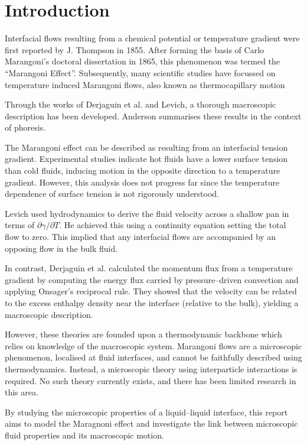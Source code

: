 \section{Introduction}
Interfacial flows resulting from a chemical potential or temperature gradient were first reported by J. Thompson in 1855.\cite{JThompson}
After forming the basis of Carlo Marangoni's doctoral dissertation in 1865, this phenomenon was termed the ``Marangoni Effect''.\cite{Marangoni}
Subsequently, many scientific studies have focussed on temperature induced Marangoni flows, also known as thermocapillary motion

Through the works of Derjaguin et al.\cite{SurfaceForces} and Levich\cite{Levich}, a thorough macroscopic description has been developed.
Anderson summarises these results in the context of phoresis.\cite{Anderson}

The Marangoni effect can be described as resulting from an interfacial tension gradient.
Experimental studies indicate hot fluids have a lower surface tension than cold fluids,\cite{Ficalbi1972,Kayser1975} inducing motion in the opposite direction to a temperature gradient.
However, this analysis does not progress far since the temperature dependence of surface tension is not rigorously understood.

Levich used hydrodynamics to derive the fluid velocity across a shallow pan in terms of $\partial \gamma / \partial T$.\cite{Levich}
He achieved this using a continuity equation setting the total flow to zero.
This implied that any interfacial flows are accompanied by an opposing flow in the bulk fluid.

In contrast, Derjaguin et al. calculated the momentum flux from a temperature gradient by computing the energy flux carried by pressure--driven convection and applying Onsager's reciprocal rule.\cite{SurfaceForces}
They showed that the velocity can be related to the excess enthalpy density near the interface (relative to the bulk), yielding a macroscopic description.

However, these theories are founded upon a thermodynamic backbone which relies on knowledge of the macroscopic system.
Marangoni flows are a microscopic phenomenon, localised at fluid interfaces, and cannot be faithfully described using thermodynamics.
Instead, a microscopic theory using interparticle interactions is required.
No such theory currently exists, and there has been limited research in this area.\cite{HolgerBoppHampe}

By studying the microscopic properties of a liquid--liquid interface, this report aims to model the Maragnoni effect and investigate the link between microscopic fluid properties and its macroscopic motion.

